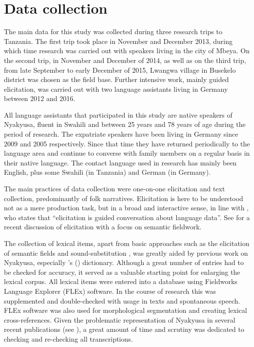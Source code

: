 \label{Varietydescribed}
\section{Data collection}\label{DataCollection}
The main data for this study was collected during three research trips to Tanzania. The first trip took place in November and December 2013, during which time research was carried out with speakers living in the city of Mbeya. On the second trip, in November and December of 2014, as well as on the third trip, from late September to early December of 2015, Lwangwa village in Busekelo district was chosen as the field base. Further intensive work, mainly guided elicitation, was carried out with two language assistants living in Germany between 2012 and 2016.

All language assistants that participated in this study are native speakers of Nyakyusa, fluent in Swahili and between 25 years and 78 years of age during the period of research. The expatriate speakers have been living in Germany since 2009 and 2005 respectively. Since that time they have returned periodically to the language area and continue to converse with family members on a regular basis in their native language. The contact language used in research has mainly been English, plus some Swahili (in Tanzania) and German (in Germany). 

The main practices of data collection were one-on-one elicitation and text collection, predominantly of folk narratives. Elicitation is here to be understood not as a mere production task, but in a broad and interactive sense, in line with \citet[2]{MousM2007}, who states that ``elicitation is guided conversation about language data''. See \citet[245--256]{CoverR2015} for a recent discussion of elicitation with a focus on semantic fieldwork.

The collection of lexical items, apart from basic approaches such as the elicitation of semantic fields and sound-substitution \citep[104--111]{CrowleyT2007}, was greatly aided by previous work on Nyakyusa, especially \citeauthor{FelbergK1996}'s (\citeyear{FelbergK1996}) dictionary. Although a great number of entries had to be checked for accuracy, it served as a valuable starting point for enlarging the lexical corpus. All lexical items were entered into a database using Fieldworks Language Explorer (FLEx) software. In the course of research this was supplemented and double-checked with usage in texts and spontaneous speech. FLEx software was also used for morphological segmentation and creating lexical cross-references. Given the problematic representation of Nyakyusa in several recent publications (see ), 
a great amount of time and scrutiny was dedicated to checking and re-checking all transcriptions.

